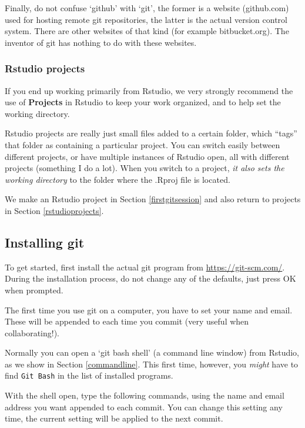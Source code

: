 \documentclass[]{book}
\begin{document}
Finally, do not confuse `github' with `git', the former is a website (github.com) used for hosting remote git repositories, the latter is the actual version control system. There are other websites of that kind (for example bitbucket.org). The inventor of git has nothing to do with these websites.

\hypertarget{rstudio-projects-1}{%
\subsubsection{Rstudio projects}\label{rstudio-projects-1}}

If you end up working primarily from Rstudio, we very strongly recommend the use of \textbf{Projects} in Rstudio to keep your work organized, and to help set the working directory.

Rstudio projects are really just small files added to a certain folder, which ``tags'' that folder as containing a particular project. You can switch easily between different projects, or have multiple instances of Rstudio open, all with different projects (something I do a lot). When you switch to a project, \emph{it also sets the working directory} to the folder where the .Rproj file is located.

We make an Rstudio project in Section \ref{firstgitsession} and also return to projects in Section \ref{rstudioprojects}.

\hypertarget{installing-git}{%
\subsection{Installing git}\label{installing-git}}

To get started, first install the actual git program from \url{https://git-scm.com/}. During the installation process, do not change any of the defaults, just press OK when prompted.

The first time you use git on a computer, you have to set your name and email. These will be appended to each time you commit (very useful when collaborating!).

Normally you can open a `git bash shell' (a command line window) from Rstudio, as we show in Section \ref{commandline}. This first time, however, you \emph{might} have to find \texttt{Git\ Bash} in the list of installed programs.

With the shell open, type the following commands, using the name and email address you want appended to each commit. You can change this setting any time, the current setting will be applied to the next commit.
\end{document}
